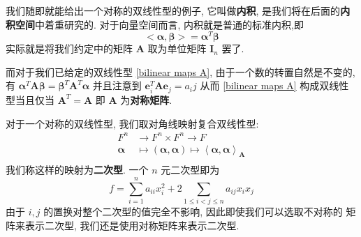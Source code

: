 \documentclass[UTF8]{book}
\begin{document}
我们随即就能给出一个对称的双线性型的例子, 它叫做\textbf{内积}, 
是我们将在后面的\textbf{内积空间}中着重研究的. 对于向量空间而言, 
内积就是普通的标准内积,即 
$$ <\boldsymbol{\alpha},\boldsymbol{\beta}> = \boldsymbol{\alpha}^T
\boldsymbol{\beta} $$
实际就是将我们约定中的矩阵 $\boldsymbol{A}$ 取为单位矩阵 $\boldsymbol{I}_n$ 
罢了. 

而对于我们已给定的双线性型 \eqref{bilinear maps A}, 
由于一个数的转置自然是不变的, 有 
$\boldsymbol{\alpha}^T \boldsymbol{A} \boldsymbol{\beta} = 
\boldsymbol{\beta}^T \boldsymbol{A}^T \boldsymbol{\alpha}$ 
并且注意到 
$ \boldsymbol{e}_i^T \boldsymbol{A} \boldsymbol{e}_j = a_ij $ 
从而 \eqref{bilinear maps A} 构成双线性型当且仅当 
$\boldsymbol{A}^T=\boldsymbol{A}$ 即 $\boldsymbol{A}$ 
为\textbf{对称矩阵}. 

对于一个对称的双线性型, 我们取对角线映射复合双线性型: 
\begin{equation}
    \begin{aligned}
        F^n &\to F^n \times F^n \to F \\
        \boldsymbol{\alpha} &\mapsto 
        (\boldsymbol{\alpha},\boldsymbol{\alpha}) \mapsto 
        \left \langle \boldsymbol{\alpha},\boldsymbol{\alpha} \right \rangle_{\boldsymbol{A}}\\
    \end{aligned}
\end{equation}
我们称这样的映射为\textbf{二次型}. 
一个 $n$ 元二次型即为 $$ f = \sum_{i=1}^{n} a_{ii}x_i^2 + 
2\sum_{1\leq i < j \leq n} a_{ij} x_ix_j $$ 
由于 $i,j$ 的置换对整个二次型的值完全不影响, 因此即使我们可以选取不对称的
矩阵来表示二次型, 我们还是使用对称矩阵来表示二次型. 
\end{document}
